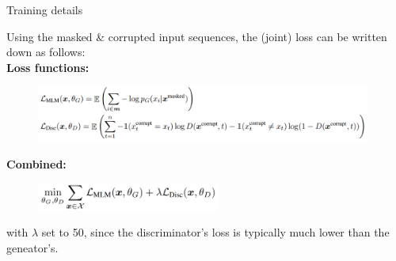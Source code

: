 
\begin{frame}{Training details}

\vfill

	Using the masked \& corrupted input sequences, the (joint) loss can be written down as follows:\\
	\vspace{.3cm}
	\textbf{Loss functions:}
	\begin{figure}
		\centering
		\includegraphics[width = 11cm]{figure/electra-loss.png}
	\end{figure}
	
	\textbf{Combined:}
	\begin{figure}
		\centering
		\includegraphics[width = 6cm]{figure/electra-loss-comb.png}
	\end{figure}
	{\footnotesize with $\lambda$ set to 50, since the discriminator's loss is typically much lower than the geneator's.}
	
\vfill

\end{frame}


